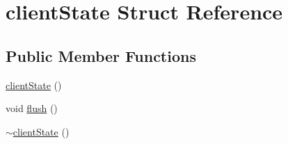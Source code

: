 \hypertarget{structclientState}{\section{client\-State \-Struct \-Reference}
\label{structclientState}
}
\subsection*{\-Public \-Member \-Functions}
\begin{DoxyCompactItemize}
\item 
\hyperlink{structclientState_aa9e2eee6eb571630c06e4913214e3200}{client\-State} ()
\item 
void \hyperlink{structclientState_a5b5f131e46e495146072cf5acd14def1}{flush} ()
\item 
\hyperlink{structclientState_ad800679a0e2d836c15add10a6d633cd3}{$\sim$client\-State} ()
\end{DoxyCompactItemize}
